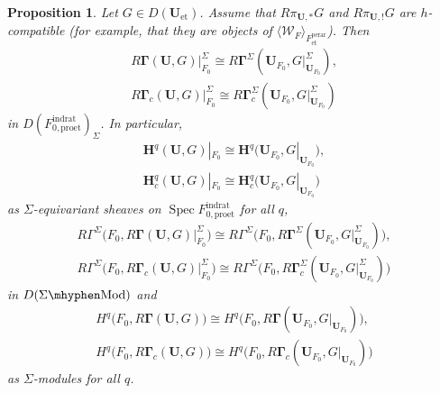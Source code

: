 \documentclass{amsart}
\newtheorem{Prop}[Thm]{Proposition}
\theoremstyle{remark}
\numberwithin{equation}{subsection}
\newcommand{\et}{\mathrm{et}}
\newcommand{\Mod}[1]{#1\mhyphen\mathrm{Mod}}
\newcommand{\rat}{\mathrm{rat}}
\newcommand{\ind}{\mathrm{ind}}
\newcommand{\pro}{\mathrm{pro}}
\newcommand{\perar}{\mathrm{perar}}
\newcommand{\alg}[1]{\mathbf{#1}}
\newcommand{\genby}[1]{\langle #1 \rangle}
\DeclareMathOperator{\Spec}{Spec}
\begin{document}
\begin{Prop} \label{0530}
	Let $G \in D(\alg{U}_{\et})$.
	Assume that $R \pi_{\alg{U}, \ast} G$ and $R \pi_{\alg{U}, !} G$ are
	$h$-compatible
	(for example, that they are objects of $\genby{\mathcal{W}_{F}}_{F^{\perar}_{\et}}$).
	Then
		\begin{equation} \label{0529}
			\begin{gathered}
						R \alg{\Gamma}(\alg{U}, G)|_{F_{0}}^{\Sigma}
					\cong
						R \alg{\Gamma}^{\Sigma}(
							\alg{U}_{F_{0}},
							G|_{\alg{U}_{F_{0}}}^{\Sigma}
						),
				\\
						R \alg{\Gamma}_{c}(\alg{U}, G)|_{F_{0}}^{\Sigma}
					\cong
						R \alg{\Gamma}_{c}^{\Sigma}(
							\alg{U}_{F_{0}},
							G|_{\alg{U}_{F_{0}}}^{\Sigma}
						)
			\end{gathered}
		\end{equation}
	in $D(F^{\ind\rat}_{0, \pro\et})_{\Sigma}$.
	In particular,
		\begin{gather*}
					\alg{H}^{q}(\alg{U}, G)|_{F_{0}}
				\cong
					\alg{H}^{q} \bigl(
						\alg{U}_{F_{0}},
						G|_{\alg{U}_{F_{0}}}
					\bigr),
			\\
					\alg{H}_{c}^{q}(\alg{U}, G)|_{F_{0}}
				\cong
					\alg{H}_{c}^{q} \bigl(
						\alg{U}_{F_{0}},
						G|_{\alg{U}_{F_{0}}}
					\bigr)
		\end{gather*}
	as $\Sigma$-equivariant sheaves on $\Spec F^{\ind\rat}_{0, \pro\et}$ for all $q$,
		\begin{gather*}
					R \Gamma^{\Sigma} \bigl(
						F_{0},
						R \alg{\Gamma}(\alg{U}, G)|_{F_{0}}^{\Sigma}
					\bigr)
				\cong
					R \Gamma^{\Sigma} \bigl(
						F_{0},
						R \alg{\Gamma}^{\Sigma}(
							\alg{U}_{F_{0}},
							G|_{\alg{U}_{F_{0}}}^{\Sigma}
						)
					\bigr),
			\\
					R \Gamma^{\Sigma} \bigl(
						F_{0},
						R \alg{\Gamma}_{c}(\alg{U}, G)|_{F_{0}}^{\Sigma}
					\bigr)
				\cong
					R \Gamma^{\Sigma} \bigl(
						F_{0},
						R \alg{\Gamma}_{c}^{\Sigma}(
							\alg{U}_{F_{0}},
							G|_{\alg{U}_{F_{0}}}^{\Sigma}
						)
					\bigr)
		\end{gather*}
	in $D(\Mod{\Sigma})$ and
		\begin{gather*}
					H^{q} \bigl(
						F_{0},
						R \alg{\Gamma}(\alg{U}, G)
					\bigr)
				\cong
					H^{q} \bigl(
						F_{0},
						R \alg{\Gamma}(
							\alg{U}_{F_{0}},
							G|_{\alg{U}_{F_{0}}}
						)
					\bigr),
			\\
					H^{q} \bigl(
						F_{0},
						R \alg{\Gamma}_{c}(\alg{U}, G)
					\bigr)
				\cong
					H^{q} \bigl(
						F_{0},
						R \alg{\Gamma}_{c}(
							\alg{U}_{F_{0}},
							G|_{\alg{U}_{F_{0}}}
						)
					\bigr)
		\end{gather*}
	as $\Sigma$-modules for all $q$.
	

\end{Prop}
\end{document}
